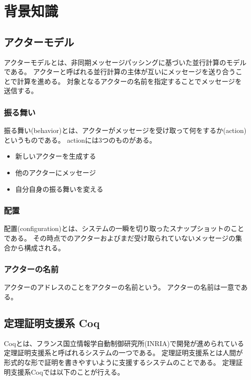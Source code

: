 \chapter{背景知識}

\section{アクターモデル}

アクターモデルとは、非同期メッセージパッシングに基づいた並行計算のモデルである。
アクターと呼ばれる並行計算の主体が互いにメッセージを送り合うことで計算を進める。
対象となるアクターの名前を指定することでメッセージを送信する。


\subsection{振る舞い}

振る舞い(behavior)とは、アクターがメッセージを受け取って何をするか(action)というものである。
actionには3つのものがある。

\begin{itemize}
\item 新しいアクターを生成する
\item 他のアクターにメッセージ
\item 自分自身の振る舞いを変える
\end{itemize}


\subsection{配置}

配置(configuration)とは、システムの一瞬を切り取ったスナップショットのことである。
その時点でのアクターおよびまだ受け取られていないメッセージの集合から構成される。

\subsection{アクターの名前}

アクターのアドレスのことをアクターの名前という。
アクターの名前は一意である。


\section{定理証明支援系 Coq}

Coqとは、フランス国立情報学自動制御研究所(INRIA)で開発が進められている定理証明支援系と呼ばれるシステムの一つである。
定理証明支援系とは人間が形式的な形で証明を書きやすいように支援するシステムのことである。
定理証明支援系Coqでは以下のことが行える。

